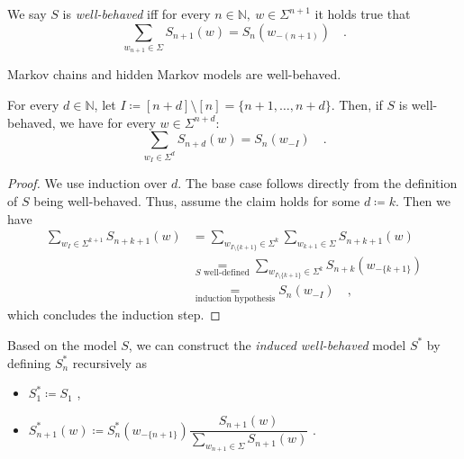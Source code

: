 \documentclass[../../main.tex]{subfiles}
\begin{document}
    \begin{definition}
        We say $S$ is \emph{well-behaved} iff for every $n \in \mathbb{N}, \ w \in \Sigma^{n + 1}$ it holds true that
        \[
            \sum_{w_{n + 1} \in \Sigma} S_{n + 1}(w) = S_n(w_{-(n + 1)}) \quad .
        \]
    \end{definition}

    \begin{remark}
        Markov chains and hidden Markov models are well-behaved.
    \end{remark}

    \begin{lemma}
        \label{lemma:random_variables_do_not_change_with_future_models}
        For every $d \in \mathbb{N}$, let $I \coloneqq [n + d] \setminus [n] = \{ n+1, \dots, n + d \}$. Then, if $S$ is well-behaved, we have for every $w \in \Sigma^{n + d}$:
        \[
            \sum_{w_I \in \Sigma^d} S_{n + d}(w) = S_n(w_{-I}) \quad .
        \]
    \end{lemma}
    \begin{proof}
        We use induction over $d$. The base case follows directly from the definition of $S$ being well-behaved. Thus, assume the claim holds for some $d \coloneqq k$. Then we have
        \begin{align*}
            \sum_{w_I \in \Sigma^{k + 1}} S_{n + k + 1}(w) &= \sum_{w_{I \setminus \{ k + 1 \}} \in \Sigma^{k}} \sum_{w_{k + 1} \in \Sigma} S_{n + k + 1}(w) \\
            &\underset{S \text{ well-defined}}{=} \sum_{w_{I \setminus \{ k + 1 \}} \in \Sigma^{k}} S_{n + k}(w_{-\{ k + 1 \}}) \\
            &\underset{\text{induction hypothesis}}{=} S_n(w_{-I}) \quad ,
        \end{align*}
        which concludes the induction step.
    \end{proof}

    \begin{definition}
        Based on the model $S$, we can construct the \emph{induced well-behaved} model $S^*$ by defining $S_n^*$ recursively as 
        \begin{itemize}
            \item $S_1^* \coloneqq S_1$ ,
            \item $S_{n + 1}^*(w) \coloneqq S_n^*(w_{-\{n+1\}}) \dfrac{S_{n+1}(w)}{\sum_{w_{n+1} \in \Sigma} S_{n+1}(w)}$ .
        \end{itemize}
    \end{definition}
\end{document}
